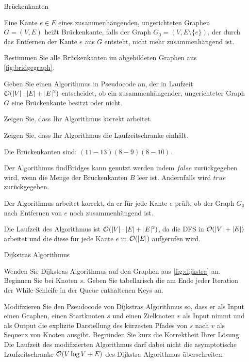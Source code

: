 \documentclass{article}
\begin{document}
\begin{eexercises}{Brückenkanten}{
    Eine Kante $e \in E$ eines zusammenhängenden, ungerichteten Graphen $G = (V, E)$ heißt Brückenkante, falls der Graph $G_0 = (V, E \setminus \{e\})$, der durch das Entfernen der Kante $e$ aus $G$ entsteht, nicht mehr zusammenhängend ist.
    
  }
  \item Bestimmen Sie alle Brückenkanten im abgebildeten Graphen aus \ref{fig:bridgegraph}.
  \item Geben Sie einen Algorithmus in Pseudocode an, der in Laufzeit $\mathcal{O}(|V| \cdot |E| + |E|^2)$ entscheidet, ob ein zusammenhängender, ungerichteter Graph $G$ eine Brückenkante besitzt oder nicht.
  \item Zeigen Sie, dass Ihr Algorithmus korrekt arbeitet.
  \item Zeigen Sie, dass Ihr Algorithmus die Laufzeitschranke einhält.
\end{eexercises}

\begin{solutions}
  \item Die Brückenkanten sind: $(11-13) (8-9) (8-10)$.
  \item Der Algorithmus findBridges kann genutzt werden indem $false$ zurückgegeben wird, wenn die Menge der Brückenkanten $B$ leer ist. Andernfalls wird $true$ zurückgegeben.\par
  
  \item Der Algorithmus arbeitet korrekt, da er für jede Kante $e$ prüft, ob der Graph $G_0$ nach Entfernen von $e$ noch zusammenhängend ist.
  \item Die Laufzeit des Algorithmus ist $\mathcal{O}(|V| \cdot |E| + |E|^2)$, da die DFS in $\mathcal{O}(|V| + |E|)$ arbeitet und die diese für jede Kante $e$ in $\mathcal{O}(|E|)$ aufgerufen wird.
\end{solutions}

\begin{eexercises}{Dijkstras Algorithmus}{}
  \item Wenden Sie Dijkstras Algorithmus auf den Graphen aus \ref{fig:dijkstra} an. Beginnen Sie bei Knoten $s$. Geben Sie tabellarisch die am Ende jeder Iteration der While-Schleife in der Queue enthaltenen Keys an.
  \item Modifizieren Sie den Pseudocode von Dijkstras Algorithmus so, dass er als Input einen Graphen, einen Startknoten $s$ und einen Zielknoten $v$ als Input nimmt und als Output die explizite Darstellung des kürzesten Pfades von $s$ nach $v$ als Sequenz von Knoten ausgibt. Begründen Sie kurz die Korrektheit Ihrer Lösung. Die Laufzeit des modifizierten Algorithmus darf dabei nicht die asymptotische Laufzeitschranke $\mathcal{O}(V \log V + E)$ des Dijkstra Algorithmus überschreiten.
\end{eexercises}
\end{document}
